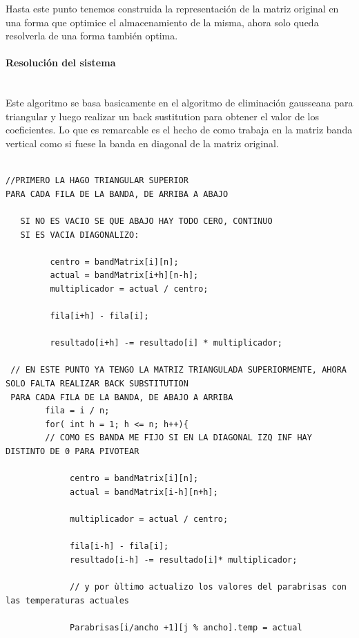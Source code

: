 Hasta este punto tenemos construida la representación de la matriz original en una forma que optimice el almacenamiento de la misma, ahora solo queda resolverla de una forma también optima.

\paragraph{Resolución del sistema} \mbox{}\\

Este algoritmo se basa basicamente en el algoritmo de eliminación gausseana para triangular y luego realizar un back sustitution para obtener el valor de los coeficientes.
Lo que es remarcable es el hecho de como trabaja en la matriz banda vertical como si fuese la banda en diagonal de la matriz original.
 
\begin{verbatim}

//PRIMERO LA HAGO TRIANGULAR SUPERIOR
PARA CADA FILA DE LA BANDA, DE ARRIBA A ABAJO
		
   SI NO ES VACIO SE QUE ABAJO HAY TODO CERO, CONTINUO
   SI ES VACIA DIAGONALIZO:
        
         centro = bandMatrix[i][n];
         actual = bandMatrix[i+h][n-h];
         multiplicador = actual / centro;
		
         fila[i+h] - fila[i];

         resultado[i+h] -= resultado[i] * multiplicador;
   
 // EN ESTE PUNTO YA TENGO LA MATRIZ TRIANGULADA SUPERIORMENTE, AHORA SOLO FALTA REALIZAR BACK SUBSTITUTION
 PARA CADA FILA DE LA BANDA, DE ABAJO A ARRIBA
        fila = i / n;
        for( int h = 1; h <= n; h++){ 
        // COMO ES BANDA ME FIJO SI EN LA DIAGONAL IZQ INF HAY DISTINTO DE 0 PARA PIVOTEAR
           
             centro = bandMatrix[i][n];
             actual = bandMatrix[i-h][n+h];
           
             multiplicador = actual / centro;
		
             fila[i-h] - fila[i];
             resultado[i-h] -= resultado[i]* multiplicador;
                
             // y por ùltimo actualizo los valores del parabrisas con las temperaturas actuales
             
             Parabrisas[i/ancho +1][j % ancho].temp = actual
\end{verbatim}





